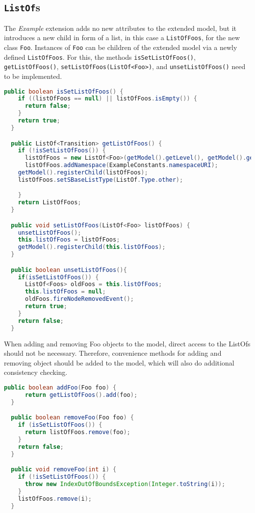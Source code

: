 \subsection{\texttt{ListOf}s}

The \emph{Example} extension adds no new attributes to the extended model,
but it introduces a new child in form of a list, in this case a \texttt{ListOfFoos},
for the new class \texttt{Foo}.
Instances of \texttt{Foo} can be children of the extended model via a newly defined \texttt{ListOfFoos}.
For this, the methods \texttt{isSetListOfFoos()}, \texttt{getListOfFoos()}, \texttt{setListOfFoos(ListOf<Foo>)}, and \texttt{unsetListOfFoos()} need to be implemented.

\begin{lstlisting}[language=Java,caption={Implementation of ListOf the methods: \texttt{isSetListOfFoos()}, \texttt{getListOfFoos()}, \texttt{setListOfFoos()}},label={lst:ModelExtListOfFoosBasic}]
public boolean isSetListOfFoos() {
    if ((listOfFoos == null) || listOfFoos.isEmpty()) {
      return false;
    }
    return true;
  }

  public ListOf<Transition> getListOfFoos() {
    if (!isSetListOfFoos()) {
      listOfFoos = new ListOf<Foo>(getModel().getLevel(), getModel().getVersion());
      listOfFoos.addNamespace(ExampleConstants.namespaceURI);
    getModel().registerChild(listOfFoos);
    listOfFoos.setSBaseListType(ListOf.Type.other);

    }
    return ListOfFoos;
  }

  public void setListOfFoos(ListOf<Foo> listOfFoos) {
    unsetListOfFoos();
    this.listOfFoos = listOfFoos;
    getModel().registerChild(this.listOfFoos);
  }

  public boolean unsetListOfFoos(){
    if(isSetListOfFoos()) {
      ListOf<Foos> oldFoos = this.listOfFoos;
      this.listOfFoos = null;
      oldFoos.fireNodeRemovedEvent();
      return true;
    }
    return false;
  }
\end{lstlisting}

When adding and removing Foo objects to the model, direct access to the ListOfs should not be necessary.
Therefore, convenience methods for adding and removing object should be added to the model, which will also do additional consistency checking.

\begin{lstlisting}[language=Java,caption={Implementaion of ListOf methods \texttt{addFoo(Foo foo)}, \texttt{removeFoo(Foo foo)}, \texttt{removeFoo(int i)}},label={lst:ModelExtAddRemoveFoos}]
  public boolean addFoo(Foo foo) {
      return getListOfFoos().add(foo);
  }

  public boolean removeFoo(Foo foo) {
    if (isSetListOfFoos()) {
      return listOfFoos.remove(foo);
    }
    return false;
  }

  public void removeFoo(int i) {
    if (!isSetListOfFoos()) {
      throw new IndexOutOfBoundsException(Integer.toString(i));
    }
    listOfFoos.remove(i);
  }
\end{lstlisting}

